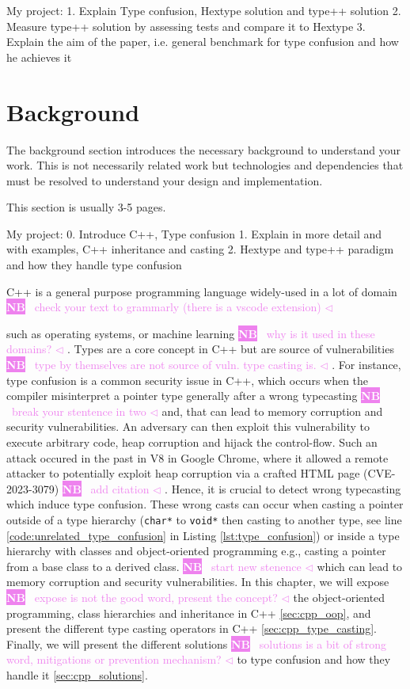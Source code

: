 \documentclass[a4paper,11pt,oneside]{report}
\newcommand{\todobox}[3]{%
       \colorbox{#1}{\textcolor{white}{\sffamily\bfseries\scriptsize #2}}%
       ~\textcolor{#1}{#3} %
       \textcolor{#1}{$\triangleleft$}%
}
\newcommand{\nb}[1]{\todobox{violet}{NB}{#1}}
\begin{document}
My project: 
1. Explain Type confusion, Hextype solution and type++ solution
2. Measure type++ solution by assessing tests and compare it to Hextype
3. Explain the aim of the paper, i.e. general benchmark for type confusion and how he achieves it

\chapter{Background}

The background section introduces the necessary background to understand your
work. This is not necessarily related work but technologies and dependencies
that must be resolved to understand your design and implementation.

This section is usually 3-5 pages.

My project:
0. Introduce C++, Type confusion
1. Explain in more detail and with examples, C++ inheritance and casting
2. Hextype and type++ paradigm and how they handle type confusion

C++ is a general purpose 
programming language widely-used in a lot of domain \nb{check your text to grammarly (there is a vscode extension)}
such as operating systems, or machine learning\nb{why is it used in these domains?}. Types are a core concept in C++
but are source of vulnerabilities\nb{type by themselves are not source of vuln. type casting is.}. For instance, type confusion is a common
security issue in C++, which occurs when the compiler misinterpret a pointer
type generally after a wrong typecasting \nb{break your stentence in two}and, that can lead to memory corruption
and security vulnerabilities. An adversary can then exploit this vulnerability
to execute arbitrary code, heap corruption and hijack the control-flow.  Such an
attack occured in the past in V8 in Google Chrome, where it allowed a remote
attacker to potentially exploit heap corruption via a crafted HTML page
(CVE-2023-3079)\nb{add citation}. Hence, it is crucial to detect wrong typecasting which induce
type confusion.  These wrong casts can occur when casting a pointer outside of a
type hierarchy (\texttt{char*} to \texttt{void*} then casting to another type,
see line \ref{code:unrelated_type_confusion} in Listing
\autoref{lst:type_confusion}) or inside a type hierarchy with classes and
object-oriented programming e.g., casting a pointer from a base class to a
derived class.  \nb{start new stenence}which can lead to memory corruption and security
vulnerabilities. In this chapter, we will expose \nb{expose is not the good word, present the concept?}the object-oriented
programming, class hierarchies and inheritance in C++ \autoref{sec:cpp_oop}, and
present the different type casting operators in C++
\autoref{sec:cpp_type_casting}.  Finally, we will present the different
solutions \nb{solutions is a bit of strong word, mitigations or prevention mechanism?}to type confusion and how they handle it \autoref{sec:cpp_solutions}.
\end{document}
